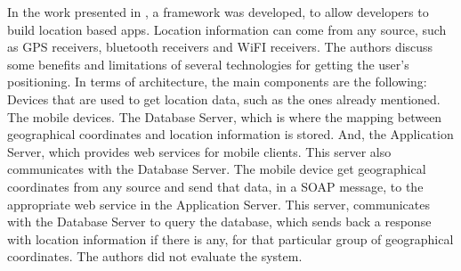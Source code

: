 In the work presented in \cite{Krevl2006}, a framework
was developed, to allow developers to build
location based apps. Location information can come
from any source, such as GPS receivers, bluetooth
receivers and WiFI receivers.
The authors discuss some benefits and limitations
of several technologies for getting the
user's positioning.
In terms of architecture, the main components
are the following:
Devices that are used to get location data, such as
the ones already mentioned. The mobile devices.
The Database Server, which is where the mapping
between geographical coordinates and location
information is stored.
And, the Application Server, which provides web services for
mobile clients. This server also communicates
with the Database Server.
The mobile device get geographical coordinates
from any source and send that data, in a
SOAP \cite{Seely:2001:SCP:560836} message,
to the appropriate web service in the Application
Server. This server, communicates with the Database Server
to query the database, which sends back a response with
location information if there is any, for that
particular group of geographical coordinates.
The authors did not evaluate the system.

